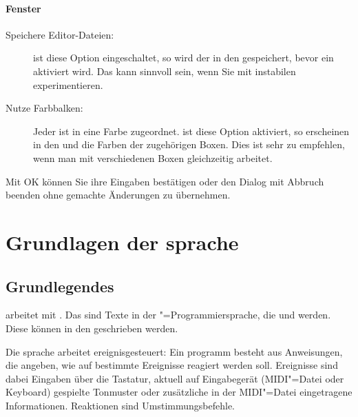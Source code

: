 {\subsection{Fenster}
\begin{description}
\item[Speichere Editor-Dateien:] ist diese Option
  eingeschaltet, so wird der  in
  den  gespeichert, bevor ein
   aktiviert wird.  Das
  kann sinnvoll sein, wenn Sie mit instabilen
   experimentieren.
\item[Nutze Farbbalken:] Jeder
   ist in \mutabor{} eine Farbe zugeordnet.
  ist diese Option aktiviert, so erscheinen in den
   und
   die Farben der
  zugehörigen Boxen. Dies ist sehr zu empfehlen, wenn man mit
  verschiedenen Boxen gleichzeitig arbeitet.
\end{description}

Mit OK können Sie ihre Eingaben bestätigen oder den Dialog 
mit Abbruch beenden ohne gemachte Änderungen zu übernehmen.




\part{Grundlagen der \mutabor sprache}
\label{sec:SX_BASICS}

\chapter{Grundlegendes}

\mutabor{} arbeitet mit
. Das sind Texte in der
\mutabor{}"=Programmiersprache, die
 und
 werden. Diese
 können in den
 geschrieben werden.

Die \mutabor{}sprache arbeitet ereignisgesteuert: Ein
\mutabor{}programm besteht aus Anweisungen, die angeben, wie auf
bestimmte Ereignisse reagiert werden soll. Ereignisse sind dabei
Eingaben über die Tastatur, aktuell auf Eingabegerät (MIDI"=Datei oder
Keyboard) gespielte Tonmuster oder zusätzliche in der MIDI"=Datei
eingetragene Informationen. Reaktionen sind Umstimmungsbefehle.

}
